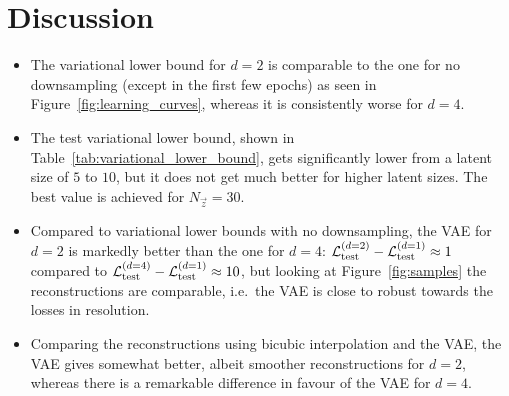 \section{Discussion}
\label{sec:discussion}

\begin{itemize}
	\item The variational lower bound for $d = 2$ is comparable to the one for no downsampling (except in the first few epochs) as seen in Figure~\ref{fig:learning_curves}, whereas it is consistently worse for $d = 4$.
	\item The test variational lower bound, shown in Table~\ref{tab:variational_lower_bound}, gets significantly lower from a latent size of $5$ to $10$, but it does not get much better for higher latent sizes. The best value is achieved for $N_{\vec{z}} = 30$.
	\item Compared to variational lower bounds with no downsampling,
	the VAE for $d = 2$ is markedly better than the one for $d = 4$: $\mathcal{L}_{\text{test}}^{(d = 2)} - \mathcal{L}_{\text{test}}^{(d = 1)} \approx 1$ compared to $\mathcal{L}_{\text{test}}^{(d = 4)} - \mathcal{L}_{\text{test}}^{(d = 1)} \approx 10$, but looking at Figure~\ref{fig:samples} the reconstructions are comparable, i.e.\ the VAE is close to robust towards the losses in resolution.
	\item Comparing the reconstructions using bicubic interpolation and the VAE, the VAE gives somewhat better, albeit smoother reconstructions for $d = 2$, whereas there is a remarkable difference in favour of the VAE for $d = 4$.
\end{itemize}
